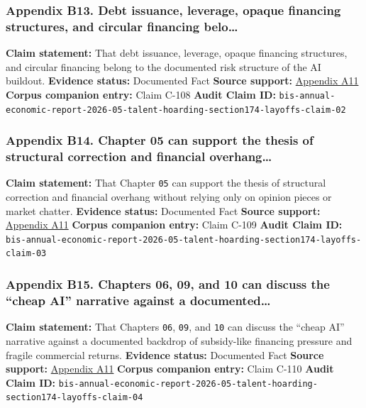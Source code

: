 \documentclass[
  american,
  11pt,
  letterpaper,
]{article}
\begin{document}
\subsubsection{Appendix B13. Debt issuance, leverage, opaque financing
structures, and circular financing
belo\ldots{}}\label{ch-05-appendix-b13-debt-issuance-leverage-opaque-financing-structures-and-circular-financing-belo}

\textbf{Claim statement:} That debt issuance, leverage, opaque financing
structures, and circular financing belong to the documented risk
structure of the AI buildout. \textbf{Evidence status:} Documented Fact
\textbf{Source support:}
\hyperref[ch-05-appendix-a11-annual-economic-report-2026]{Appendix A11}
\textbf{Corpus companion entry:} Claim C-108 \textbf{Audit Claim ID:}
\texttt{bis-annual-economic-report-2026-05-talent-hoarding-section174-layoffs-claim-02}

\subsubsection{Appendix B14. Chapter 05 can support the thesis of
structural correction and financial
overhang\ldots{}}\label{ch-05-appendix-b14-chapter-05-can-support-the-thesis-of-structural-correction-and-financial-overhang}

\textbf{Claim statement:} That Chapter \texttt{05} can support the
thesis of structural correction and financial overhang without relying
only on opinion pieces or market chatter. \textbf{Evidence status:}
Documented Fact \textbf{Source support:}
\hyperref[ch-05-appendix-a11-annual-economic-report-2026]{Appendix A11}
\textbf{Corpus companion entry:} Claim C-109 \textbf{Audit Claim ID:}
\texttt{bis-annual-economic-report-2026-05-talent-hoarding-section174-layoffs-claim-03}

\subsubsection{Appendix B15. Chapters 06, 09, and 10 can discuss the
``cheap AI'' narrative against a
documented\ldots{}}\label{ch-05-appendix-b15-chapters-06-09-and-10-can-discuss-the-cheap-ai-narrative-against-a-documented}

\textbf{Claim statement:} That Chapters \texttt{06}, \texttt{09}, and
\texttt{10} can discuss the ``cheap AI'' narrative against a documented
backdrop of subsidy-like financing pressure and fragile commercial
returns. \textbf{Evidence status:} Documented Fact \textbf{Source
support:}
\hyperref[ch-05-appendix-a11-annual-economic-report-2026]{Appendix A11}
\textbf{Corpus companion entry:} Claim C-110 \textbf{Audit Claim ID:}
\texttt{bis-annual-economic-report-2026-05-talent-hoarding-section174-layoffs-claim-04}
\end{document}
